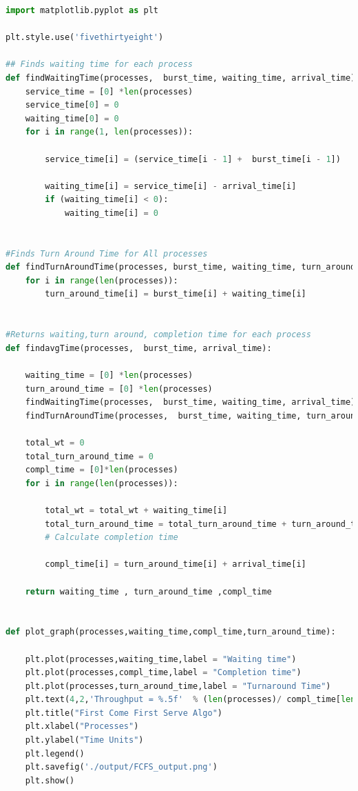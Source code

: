 \documentclass[11pt,a4paper]{report}
\begin{document}
\begin{lstlisting}[language=Python,caption=fcfs source code,breaklines=true,postbreak=\mbox{\textcolor{red}{$\hookrightarrow$}\space},]
import matplotlib.pyplot as plt

plt.style.use('fivethirtyeight')

## Finds waiting time for each process
def findWaitingTime(processes,  burst_time, waiting_time, arrival_time):  
    service_time = [0] *len(processes) 
    service_time[0] = 0
    waiting_time[0] = 0
    for i in range(1, len(processes)):  
           
        service_time[i] = (service_time[i - 1] +  burst_time[i - 1])  
  
        waiting_time[i] = service_time[i] - arrival_time[i]  
        if (waiting_time[i] < 0): 
            waiting_time[i] = 0
      

#Finds Turn Around Time for All processes
def findTurnAroundTime(processes, burst_time, waiting_time, turn_around_time):  
    for i in range(len(processes)): 
        turn_around_time[i] = burst_time[i] + waiting_time[i]  
  
  
#Returns waiting,turn around, completion time for each process
def findavgTime(processes,  burst_time, arrival_time):  

    waiting_time = [0] *len(processes)
    turn_around_time = [0] *len(processes) 
    findWaitingTime(processes,  burst_time, waiting_time, arrival_time)  
    findTurnAroundTime(processes,  burst_time, waiting_time, turn_around_time)  

    total_wt = 0
    total_turn_around_time = 0
    compl_time = [0]*len(processes)
    for i in range(len(processes)): 
  
        total_wt = total_wt + waiting_time[i]  
        total_turn_around_time = total_turn_around_time + turn_around_time[i]  
        # Calculate completion time

        compl_time[i] = turn_around_time[i] + arrival_time[i] 

    return waiting_time , turn_around_time ,compl_time


def plot_graph(processes,waiting_time,compl_time,turn_around_time):

    plt.plot(processes,waiting_time,label = "Waiting time")
    plt.plot(processes,compl_time,label = "Completion time")
    plt.plot(processes,turn_around_time,label = "Turnaround Time")
    plt.text(4,2,'Throughput = %.5f'  % (len(processes)/ compl_time[len(processes)-1]))
    plt.title("First Come First Serve Algo")
    plt.xlabel("Processes")
    plt.ylabel("Time Units")
    plt.legend()
    plt.savefig('./output/FCFS_output.png')
    plt.show()




\end{lstlisting}
\end{document}
